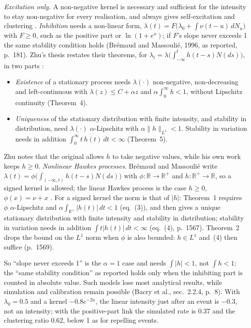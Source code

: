 \begin{qfmodel}
 \emph{Excitation only.} A non-negative kernel is necessary and sufficient for the intensity to stay non-negative for every realisation, and always gives self-excitation and clustering \citep[chap.~9, sec.~9.5, p.~181]{catalogue-0528}. \emph{Inhibition} needs a non-linear form, $\lambda(t)=F\bigl(\lambda_0+\int\nu(t-u)\,dN_u\bigr)$ with $F\ge0$, such as the positive part or $\ln(1+e^x)$; if $F$'s slope never exceeds 1 the same stability condition holds (Brémaud and Massoulié, 1996, as reported, p.~181). Zhu's thesis restates their theorems, for $\lambda_t=\lambda\bigl(\int_{-\infty}^th(t-s)N(ds)\bigr)$, in two parts \citep[arXiv v3, sec.~1.5, Theorems~4--5, pp.~33--34]{zhu-nonlinear-hawkes-2013}:
\begin{itemize}
\item \emph{Existence} of a stationary process needs $\lambda(\cdot)$ non-negative, non-decreasing and left-continuous with $\lambda(z)\le C+\alpha z$ and $\alpha\int_0^\infty h<1$, without Lipschitz continuity (Theorem~4).
\item \emph{Uniqueness} of the stationary distribution with finite intensity, and stability in distribution, need $\lambda(\cdot)$ $\alpha$-Lipschitz with $\alpha\|h\|_{L^1}<1$. Stability in variation needs in addition $\int_0^\infty t\,h(t)\,dt<\infty$ (Theorem~5).
\end{itemize}
Zhu notes that the original allows $h$ to take negative values, while his own work keeps $h\ge0$. \emph{Nonlinear Hawkes processes}. Brémaud and Massoulié write $\lambda(t)=\phi\bigl(\int_{(-\infty,t)}h(t-s)N(ds)\bigr)$ with $\phi:\mathbb R\to\mathbb R^+$ and $h:\mathbb R^+\to\mathbb R$, so a signed kernel is allowed; the linear Hawkes process is the case $h\ge0$, $\phi(x)=\nu+x$ \citep[eq.~(1), p.~1564]{bremaud-massoulie-1996}. For a signed kernel the norm is that of $|h|$: Theorem~1 requires $\phi$ $\alpha$-Lipschitz and $\alpha\int_{\mathbb R^+}|h(t)|\,dt<1$ (eq.~(3)), and then gives a unique stationary distribution with finite intensity and stability in distribution; stability in variation needs in addition $\int t|h(t)|\,dt<\infty$ (eq.~(4), p.~1567). Theorem~2 drops the bound on the $L^1$ norm when $\phi$ is also bounded: $h\in L^1$ and~(4) then suffice (p.~1569).

So ``slope never exceeds 1'' is the $\alpha=1$ case and needs $\int|h|<1$, not $\int h<1$; the ``same stability condition'' as reported holds only when the inhibiting part is counted in absolute value. Such models lose most analytical results, while simulation and calibration remain possible (Bacry et al., sec.~2.2.4, p.~8). With $\lambda_0=0.5$ and a kernel $-0.8e^{-2u}$, the linear intensity just after an event is $-0.3$, not an intensity; with the positive-part link the simulated rate is 0.37 and the clustering ratio 0.62, below 1 as for repelling events.


\end{qfmodel}
